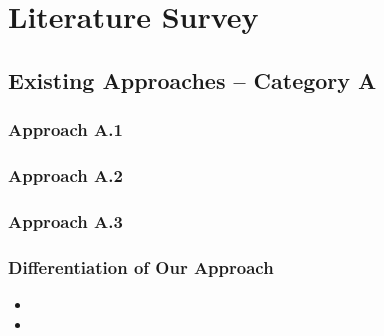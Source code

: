 \documentclass[12pt, a4paper, oneside]{report}
\begin{document}
\lipsum[29][1-3]

\chapter{Literature Survey}
\label{chap:literature}

\lipsum[30][1-7]

\section{Existing Approaches -- Category A}
\label{sec:category-a}

\subsection{Approach A.1}
\lipsum[31][1-3] \cite{ref1}

\subsection{Approach A.2}
\lipsum[32][1-3] \cite{ref2}

\subsection{Approach A.3}
\lipsum[33][1-3] \cite{ref3}

\subsection{Differentiation of Our Approach}
\lipsum[34][1-2]

\begin{itemize}
    \item \lipsum[35][1-1]
    \item \lipsum[36][1-1]
\end{itemize}

\lipsum[37][1-2]
\end{document}
